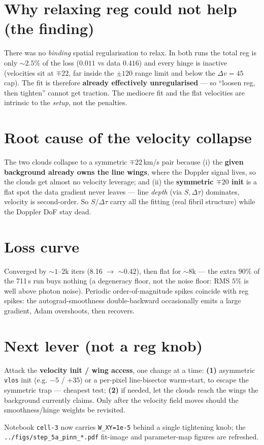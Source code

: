 \documentclass[10pt,a4paper]{article}
\newcommand{\co}[1]{{\small\texttt{#1}}}
\begin{document}
\section{Why relaxing reg could not help (the finding)}

There was no \emph{binding} spatial regularisation to relax. In both runs the total reg is only ${\sim}2.5\%$ of the loss ($0.011$ vs data $0.416$) and every hinge is inactive (velocities sit at $\mp22$, far inside the $\pm120$ range limit and below the $\Delta v\!=\!45$ cap). The fit is therefore \textbf{already effectively unregularised} --- so ``loosen reg, then tighten'' cannot get traction. The mediocre fit and the flat velocities are intrinsic to the \emph{setup}, not the penalties.

\section{Root cause of the velocity collapse}

The two clouds collapse to a symmetric $\mp22$\,km/s pair because (i) the \textbf{given background already owns the line wings}, where the Doppler signal lives, so the clouds get almost no velocity leverage; and (ii) the \textbf{symmetric $\mp20$ init} is a flat spot the data gradient never leaves --- line \emph{depth} (via $S,\Delta\tau$) dominates, velocity is second-order. So $S/\Delta\tau$ carry all the fitting (real fibril structure) while the Doppler DoF stay dead.

\section{Loss curve}

Converged by ${\sim}1$--$2$k iters (8.16 $\to$ ${\sim}0.42$), then flat for ${\sim}8$k --- the extra $90\%$ of the 711\,s run buys nothing (a degeneracy floor, not the noise floor: RMS $5\%$ is well above photon noise). Periodic order-of-magnitude spikes coincide with reg spikes: the autograd-smoothness double-backward occasionally emits a large gradient, Adam overshoots, then recovers.

\section{Next lever (not a reg knob)}

Attack the \textbf{velocity init / wing access}, one change at a time: \textbf{(1)} asymmetric \co{vlos} init (e.g. $-5$ / $+35$) or a per-pixel line-bisector warm-start, to escape the symmetric trap --- cheapest test; \textbf{(2)} if needed, let the clouds reach the wings the background currently claims. Only after the velocity field moves should the smoothness/hinge weights be revisited.

\vspace{1pt}{\footnotesize\color{gry}\rule{\textwidth}{0.4pt}}
{\sffamily\color{gry}\footnotesize Notebook \co{cell-3} now carries \co{W\_XY=1e-5} behind a single tightening knob; the \co{../figs/step\_5a\_pinn\_*.pdf} fit-image and parameter-map figures are refreshed.}
\end{document}
